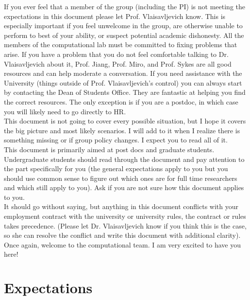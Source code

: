 \documentclass[letterpaper]{article}
\begin{document}
If you ever feel that a member of the group (including the PI) is not meeting the expectations in this document please let Prof. Vlaisavljevich know. This is especially important if you feel unwelcome in the group, are otherwise unable to perform to best of your ability, or suspect potential academic dishonesty. All the members of the computational lab must be committed to fixing problems that arise. If you have a problem that you do not feel comfortable talking to Dr. Vlaisavljevich about it, Prof. Jiang, Prof. Miro, and Prof. Sykes are all good resources and can help moderate a conversation. If you need assistance with the University (things outside of Prof. Vlaisavljevich's control) you can always start by contacting the Dean of Students Office. They are fantastic at helping you find the correct resources. The only exception is if you are a postdoc, in which case you will likely need to go directly to HR. \\

This document is not going to cover every possible situation, but I hope it covers the big picture and most likely scenarios. I will add to it when I realize there is something missing or if group policy changes. I expect you to read all of it.\\

This document is primarily aimed at post docs and graduate students. Undergraduate students should read through the document and pay attention to the part specifically for you (the general expectations apply to you but you should use common sense to figure out which ones are for full time researchers and which still apply to you). Ask if you are not sure how this document applies to you.\\

It should go without saying, but anything in this document conflicts with your employment contract with the university or university rules, the contract or rules takes precedence. (Please let Dr. Vlaisavljevich know if you think this is the case, so she can resolve the conflict and write this document with additional clarity).\\

Once again, welcome to the computational team. I am very excited to have you here!

\section{Expectations}
\end{document}
